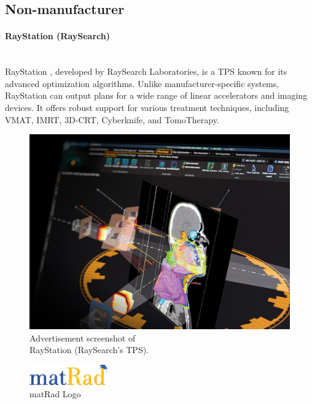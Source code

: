 \subsection{Non-manufacturer}
\Needspace{5cm}
\begin{multicols}{2}
	\paragraph{RayStation (RaySearch)}
	\ \\
	RayStation \cite{raystation}, developed by RaySearch Laboratories, is a TPS known for its advanced optimization algorithms.
	Unlike manufacturer-specific systems, RayStation can output plans for a wide range of linear accelerators and imaging devices.
	It offers robust support for various treatment techniques, including VMAT, IMRT, 3D-CRT, Cyberknife, and TomoTherapy.
	
	\columnbreak
	
	\begin{figure}[H]
		\centering
		\captionsetup{width=\linewidth}
		\includegraphics[width=\linewidth]{RaySearchRayStation.png}
		\caption{Advertisement screenshot of \\ RayStation (RaySearch's TPS).}
		\label{fig:screenshot_raysearch}
	\end{figure}
\end{multicols}

\begin{figure}
	\vspace{-0.5cm}
	\centering
	\includegraphics[width=0.3\textwidth]{matRad.png}
	\caption{matRad Logo}
	\label{fig:matRad_logo}
	\vspace{-0.5cm}
\end{figure}
